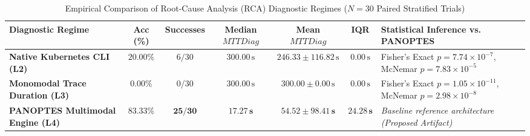 \begin{table}[!htbp]
\centering
\small
\caption{Empirical Comparison of Root-Cause Analysis (RCA) Diagnostic Regimes ($N=30$ Paired Stratified Trials)}
\label{tab:evaluation_results}
\begin{tabularx}{\textwidth}{@{}l c c c c c X@{}}
\toprule
\textbf{Diagnostic Regime} & \textbf{Acc (\%) } & \textbf{Successes} & \textbf{Median $MTTDiag$} & \textbf{Mean $MTTDiag$} & \textbf{IQR} & \textbf{Statistical Inference vs. PANOPTES} \\ \midrule
\textbf{Native Kubernetes CLI (L2)} & $20.00\%$ & $6/30$ & $300.00\,\text{s}$ & $246.33 \pm 116.82\,\text{s}$ & $0.00\,\text{s}$ & Fisher's Exact $p = 7.74 \times 10^{-7}$, McNemar $p = 7.83 \times 10^{-5}$ \\ \addlinespace[2pt]
\textbf{Monomodal Trace Duration (L3)} & $0.00\%$ & $0/30$ & $300.00\,\text{s}$ & $300.00 \pm 0.00\,\text{s}$ & $0.00\,\text{s}$ & Fisher's Exact $p = 1.05 \times 10^{-11}$, McNemar $p = 2.98 \times 10^{-8}$ \\ \addlinespace[2pt]
\textbf{PANOPTES Multimodal Engine (L4)} & $\mathbf{83.33\%}$ & $\mathbf{25/30}$ & $\mathbf{17.27\,\text{s}}$ & $\mathbf{54.52 \pm 98.41\,\text{s}}$ & $\mathbf{24.28\,\text{s}}$ & \textit{Baseline reference architecture (Proposed Artifact)} \\ \bottomrule
\end{tabularx}
\end{table}
